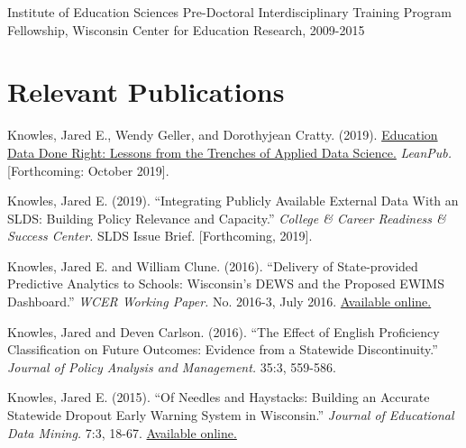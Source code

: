 \documentclass[margin,line]{res}
\begin{document}
\begin{resume}
\vspace*{-2.5mm}

Institute of Education Sciences Pre-Doctoral Interdisciplinary Training Program 
Fellowship, Wisconsin Center for Education Research, 2009-2015



\vspace*{-2.5mm}
\section{\sc Relevant Publications}

Knowles, Jared E., Wendy Geller, and Dorothyjean Cratty. (2019). \uline{Education Data Done Right: Lessons from the Trenches of Applied Data Science.} \emph{LeanPub.} [Forthcoming: October 2019].

Knowles, Jared E. (2019). ``Integrating Publicly Available External Data With an SLDS: Building 
Policy Relevance and Capacity.'' \emph{College & Career Readiness & Success Center.} 
SLDS Issue Brief. [Forthcoming, 2019].

Knowles, Jared E. and William Clune. (2016). ``Delivery of State-provided Predictive
Analytics to Schools: Wisconsin’s DEWS and the Proposed EWIMS Dashboard.'' 
\emph{WCER Working Paper.} No. 2016-3, July 2016. \href{http://wcer-web.ad.education.wisc.edu/docs/working-papers/Working_Paper_No_2016_03.pdf}{Available online.}

Knowles, Jared and Deven Carlson. (2016). ``The Effect of English Proficiency Classification on Future Outcomes: 
Evidence from a Statewide Discontinuity.'' \emph{Journal of Policy Analysis and Management.}
35:3, 559-586. 

Knowles, Jared E. (2015). ``Of Needles and Haystacks: Building an Accurate Statewide 
Dropout Early Warning System in Wisconsin.'' \emph{Journal of Educational Data 
Mining.} 7:3, 18-67. 
\href{http://www.educationaldatamining.org/JEDM/index.php/JEDM/article/view/JEDM082}{Available online.}
% 
% 
% 
% 


\end{resume}
\end{document}
